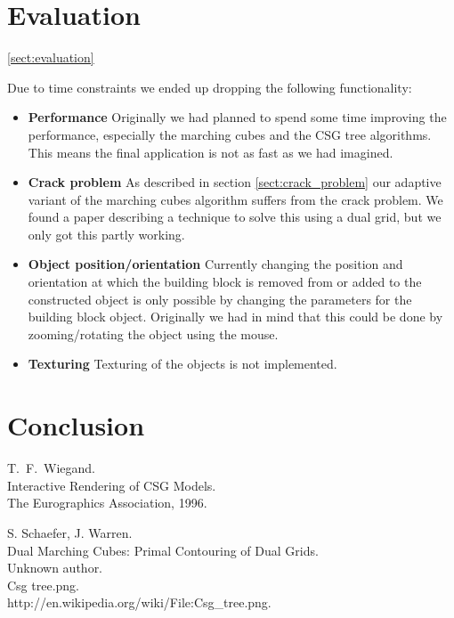 \documentclass[a4paper,10pt,twocolumn]{article}
\begin{document}
\section{Evaluation}
\ref{sect:evaluation}

Due to time constraints we ended up dropping the following functionality:

\begin{itemize}
    \item[] \textbf{Performance} Originally we had planned to spend some time improving the performance, especially the marching cubes and the CSG tree algorithms. This means the final application is not as fast as we had imagined.
    \item[] \textbf{Crack problem} As described in section \ref{sect:crack_problem} our adaptive variant of the marching cubes algorithm suffers from the crack problem. We found a paper \cite{DMC} describing a technique to solve this using a dual grid, but we only got this partly working.
    \item[] \textbf{Object position/orientation} Currently changing the position and orientation at which the building block is removed from or added to the constructed object is only possible by changing the parameters for the building block object. Originally we had in mind that this could be done by zooming/rotating the object using the mouse.
    \item[] \textbf{Texturing} Texturing of the objects is not implemented.
\end{itemize}


\section{Conclusion}


\begin{thebibliography}{99}
    T.~F.~Wiegand.\\
    Interactive Rendering of CSG Models.\\
    The Eurographics Association, 1996.

    S. Schaefer, J. Warren. \\
    Dual Marching Cubes: Primal Contouring of Dual Grids. \\

    Unknown author.\\
    Csg tree.png.\\
    http://en.wikipedia.org/wiki/File:Csg\_tree.png.\\
\end{thebibliography}
\end{document}
